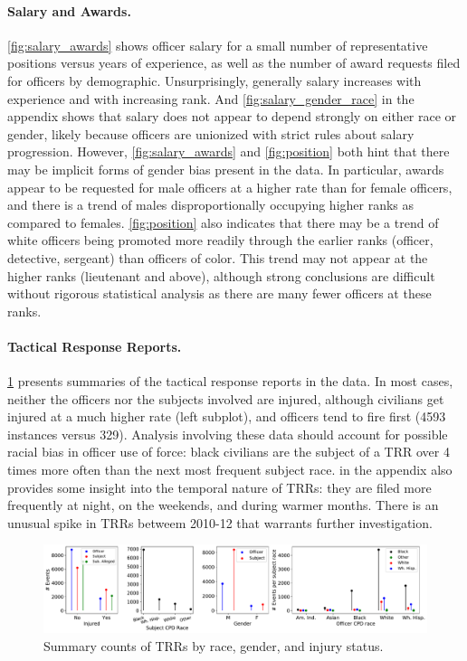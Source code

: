 \paragraph{Salary and Awards.} \cref{fig:salary_awards} shows officer salary for a small number of representative
positions versus years of experience, as well as the number of award requests filed for officers by demographic.
Unsurprisingly, generally salary increases with experience and with increasing rank. 
And \cref{fig:salary_gender_race} in the appendix shows that salary does not appear to depend strongly on either race or gender,
likely because officers are unionized with strict rules about salary progression.
However, \cref{fig:salary_awards} and \cref{fig:position} both hint that there may be implicit forms of gender
bias present in the data. In particular, awards appear to be requested for male officers at a higher rate than for female officers,
and there is a trend of males disproportionally occupying higher ranks as compared to females.
\cref{fig:position} also indicates that there may be a trend of white officers being promoted more readily 
through the earlier ranks (officer, detective, sergeant) than officers of color.
This trend may not appear at the higher ranks (lieutenant and above), although strong conclusions are difficult without 
rigorous statistical analysis as there are many fewer officers at these ranks.

\paragraph{Tactical Response Reports.}
\cref{fig:trrs_stats1} presents summaries of the tactical response reports in the data.
 In most cases, neither the officers nor the
subjects involved are injured, although civilians get injured at a much higher
rate (left subplot), and officers tend to fire first (4593 instances versus 329).
Analysis involving these data should account for possible racial bias in officer use of force: 
black civilians are the subject of a TRR over 4 times more often than the next 
most frequent subject race. 
 in the appendix also provides some 
insight into the temporal nature of TRRs: they are filed more frequently 
at night, on the weekends, and during warmer months. 
There is an unusual spike in TRRs betweem 2010-12 that warrants further investigation.

\begin{figure}[t!] 
	\includegraphics[width=\textwidth]{figs/trr_stats} 
	\caption{Summary counts of TRRs by race, gender, and injury status.} \label{fig:trrs_stats1}
\end{figure}





